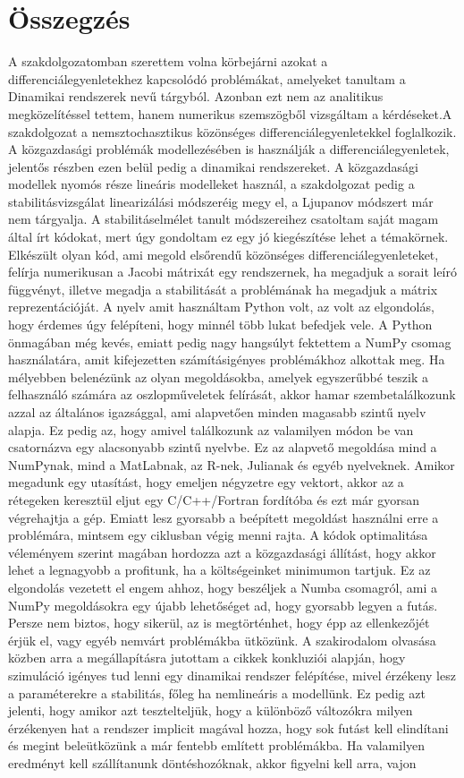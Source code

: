 \documentclass{article}
\theoremstyle{definition}
\theoremstyle{theorem}
\begin{document}
\section{Összegzés}
A szakdolgozatomban szerettem volna körbejárni azokat a differenciálegyenletekhez kapcsolódó problémákat, amelyeket tanultam a Dinamikai rendszerek nevű tárgyból. Azonban ezt nem az analitikus megközelítéssel tettem, hanem  numerikus szemszögből vizsgáltam a kérdéseket.A szakdolgozat a nemsztochasztikus közönséges differenciálegyenletekkel foglalkozik. A közgazdasági problémák modellezésében is használják a differenciálegyenletek, jelentős részben ezen belül pedig a dinamikai rendszereket. A közgazdasági modellek nyomós része lineáris modelleket használ, a szakdolgozat pedig a stabilitásvizsgálat linearizálási módszeréig megy el, a Ljupanov módszert már nem tárgyalja. A stabilitáselmélet tanult módszereihez csatoltam saját magam által írt kódokat, mert úgy gondoltam ez egy jó kiegészítése lehet a témakörnek. Elkészült olyan kód, ami megold elsőrendű közönséges differenciálegyenleteket, felírja numerikusan a Jacobi mátrixát egy rendszernek, ha megadjuk a sorait leíró függvényt, illetve megadja a stabilitását a problémának ha megadjuk a mátrix reprezentációját. A nyelv amit használtam Python volt, az volt az elgondolás, hogy érdemes úgy felépíteni, hogy minnél több lukat befedjek vele. A Python önmagában még kevés, emiatt pedig nagy hangsúlyt fektettem a NumPy csomag használatára, amit kifejezetten számításigényes problémákhoz alkottak meg. Ha mélyebben belenézünk az olyan megoldásokba, amelyek egyszerűbbé teszik a felhasználó számára az oszlopműveletek felírását, akkor hamar szembetalálkozunk azzal az általános igazsággal, ami alapvetően minden magasabb szintű nyelv alapja. Ez pedig az, hogy amivel találkozunk az valamilyen módon be van csatornázva egy alacsonyabb szintű nyelvbe. Ez az alapvető megoldása mind a NumPynak, mind a MatLabnak, az R-nek, Julianak és egyéb nyelveknek. Amikor megadunk egy utasítást, hogy emeljen négyzetre egy vektort, akkor az a rétegeken keresztül eljut egy C/C++/Fortran fordítóba és ezt már gyorsan végrehajtja a gép. Emiatt lesz gyorsabb a beépített megoldást használni erre a problémára, mintsem egy ciklusban végig menni rajta. A kódok optimalitása véleményem szerint magában hordozza azt a közgazdasági állítást, hogy akkor lehet a legnagyobb a profitunk, ha a költségeinket minimumon tartjuk.  Ez az elgondolás vezetett el engem ahhoz, hogy beszéljek a Numba csomagról, ami a NumPy megoldásokra egy újabb lehetőséget ad, hogy gyorsabb legyen a futás. Persze nem biztos, hogy sikerül, az is megtörténhet, hogy épp az ellenkezőjét érjük el, vagy egyéb nemvárt problémákba ütközünk. A szakirodalom olvasása közben arra a megállapításra jutottam a cikkek konkluziói alapján, hogy szimuláció igényes tud lenni egy dinamikai rendszer felépítése, mivel érzékeny lesz a paraméterekre a stabilitás, főleg ha nemlineáris a modellünk. Ez pedig azt jelenti, hogy amikor azt tesztelteljük, hogy a különböző változókra milyen érzékenyen hat a rendszer implicit magával hozza, hogy sok futást kell elindítani és megint beleütközünk a már fentebb említett problémákba. Ha valamilyen eredményt kell szállítanunk döntéshozóknak, akkor figyelni kell arra, vajon 
\end{document}
